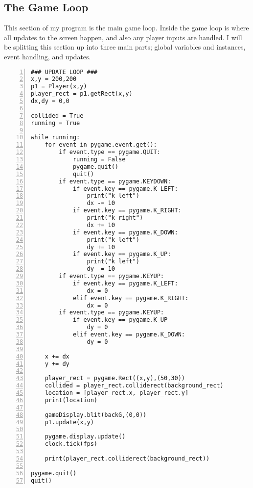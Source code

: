 \documentclass[12pt]{report}
\begin{document}
\pagebreak

\subsection{The Game Loop}
This section of my program is the main game loop. Inside the game loop is where all updates to the screen happen, and also any player inputs are handled. I will be splitting this section up into three main parts; global variables and instances, event handling, and updates.

\scriptsize

\begin{Verbatim}[numbers=left, frame=single]
### UPDATE LOOP ###
x,y = 200,200
p1 = Player(x,y)
player_rect = p1.getRect(x,y)
dx,dy = 0,0

collided = True
running = True

while running:
    for event in pygame.event.get():
        if event.type == pygame.QUIT:
            running = False
            pygame.quit()
            quit()
        if event.type == pygame.KEYDOWN:
            if event.key == pygame.K_LEFT:
                print("k left")
                dx -= 10
            if event.key == pygame.K_RIGHT:
                print("k right")
                dx += 10
            if event.key == pygame.K_DOWN:
                print("k left")
                dy += 10
            if event.key == pygame.K_UP:
                print("k left")
                dy -= 10
        if event.type == pygame.KEYUP:
            if event.key == pygame.K_LEFT:
                dx = 0
            elif event.key == pygame.K_RIGHT:
                dx = 0
        if event.type == pygame.KEYUP:
            if event.key == pygame.K_UP
                dy = 0
            elif event.key == pygame.K_DOWN:
                dy = 0
                
    x += dx
    y += dy
    
    player_rect = pygame.Rect((x,y),(50,30))
    collided = player_rect.colliderect(background_rect)
    location = [player_rect.x, player_rect.y]
    print(location)
    
    gameDisplay.blit(backG,(0,0))
    p1.update(x,y)
    
    pygame.display.update()
    clock.tick(fps)
    
    print(player_rect.colliderect(background_rect))
    
pygame.quit()
quit()
\end{Verbatim}

\normalsize
\end{document}
